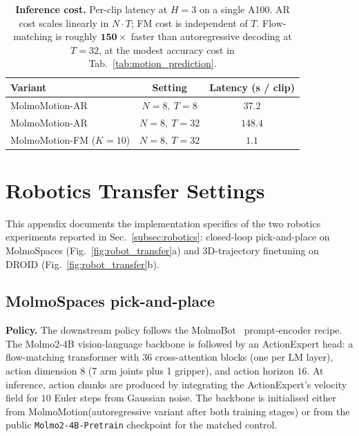 \documentclass{llmxive}
\providecommand{\modelname}{MolmoMotion\xspace}
\providecommand{\arraystretch}{1.12}
\begin{document}
\begin{table}[!htbp]
\centering
\small
\setlength{\tabcolsep}{6pt}
\renewcommand{\arraystretch}{1.12}
\begin{tabular}{@{}l c c@{}}
Variant & Setting & Latency (s / clip) \\
\midrule
\modelname-AR & $N{=}8,\ T{=}8$  & $37.2$ \\
\modelname-AR & $N{=}8,\ T{=}32$ & $148.4$ \\
\modelname-FM ($K{=}10$) & $N{=}8,\ T{=}32$ & $\mathbf{1.1}$ \\
\end{tabular}
\vspace{5pt}
\caption{\textbf{Inference cost.} Per-clip latency at $H{=}3$ on a single
A100. AR cost scales linearly in $N{\cdot}T$; FM cost is independent of
$T$. Flow-matching is roughly $\mathbf{150\times}$ faster than
autoregressive decoding at $T{=}32$, at the modest accuracy cost in
Tab.~\ref{tab:motion_prediction}.}
\label{tab:latency}
\end{table}


\section{Robotics Transfer Settings}
\label{appsec:robotics}

This appendix documents the implementation specifics of the two robotics
experiments reported in Sec.~\ref{subsec:robotics}: closed-loop pick-and-place
on MolmoSpaces (Fig.~\ref{fig:robot_transfer}a) and 3D-trajectory finetuning
on DROID (Fig.~\ref{fig:robot_transfer}b).

\subsection{MolmoSpaces pick-and-place}
\label{appsec:molmospaces}

\noindent\textbf{Policy.}
The downstream policy follows the MolmoBot~\cite{deshpande2026molmobot} prompt-encoder
recipe. The Molmo2-4B vision-language backbone is followed by an ActionExpert
head: a flow-matching transformer with $36$ cross-attention blocks (one per
LM layer), action dimension $8$ (7 arm joints plus 1 gripper), and action
horizon $16$. At inference, action chunks are produced by integrating the
ActionExpert's velocity field for $10$ Euler steps from Gaussian noise. The
backbone is initialised either from \modelname (autoregressive variant after
both training stages) or from the public \texttt{Molmo2-4B-Pretrain}
checkpoint for the matched control.
\end{document}
